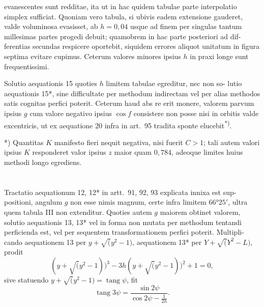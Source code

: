 \documentclass[12pt,a4paper]{article}
\newcommand{\tang}{\mathop{\mathrm{tang}}\nolimits}
\begin{document}
evanescentes sunt redditae, ita ut in hac quidem tabulae parte interpolatio
simplex sufficiat. Quoniam vero tabula, si ubivis eadem extensione gauderet,
valde voluminosa evasisset, ab $h = 0{,}04$ usque ad finem per singulas tantum
millesimas partes progedi debuit; quamobrem in hac parte posteriori ad dif-
ferentias secundas respicere oportebit, siquidem errores aliquot unitatum in
figura septima evitare cupimus. Ceterum valores minores ipsius $h$ in praxi
longe sunt frequentissimi.

Solutio aequationis 15 quoties $h$ limitem tabulae egreditur, nec non so-
lutio aequationis 15*, sine difficultate per methodum indirectam vel per alias
methodos satis cognitas perfici poterit. Ceterum haud abs re erit monere,
valorem parvum ipsius $g$ cum valore negativo ipsius $\cos f$ consistere non posse
nisi in orbitis valde excentricis, ut ex aequatione 20 infra in art.~95 tradita
sponte elucebit\textsuperscript{*)}.

\begin{flushright}
\small\begin{minipage}{0.8\textwidth}
\raggedleft
*) Quantitas $K$ manifesto fieri nequit negativa, nisi fuerit $C > 1$; tali autem valori ipsius $K$ responderet
valor ipsius $z$ maior quam $0{,}784$, adeoque limites huius methodi longo egrediens.
\end{minipage}
\end{flushright}

\section{}

Tractatio aequationum 12, 12* in artt.~91, 92, 93 explicata innixa est sup-
positioni, angulum $g$ non esse nimis magnum, certe infra limitem $66°25'$, ultra
quem tabula III non extenditur. Quoties autem $g$ maiorem obtinet valorem,
solutio aequationis 13, 13* vel in forma non mutata per methodum tentandi
perficienda est, vel per sequentem transformationem perfici poterit. Multipli-
cando aequationem 13 per $y + \surd(y^2 - 1)$, aequationem 13* per $Y + \surd(Y^2 - L)$,
prodit
\begin{equation}
(y + \surd(y^2 - 1))^3 - 3h(y + \surd(y^2 - 1))^2 + 1 = 0,
\end{equation}
sive statuendo $y + \surd(y^2 - 1) = \tang\psi$, fit
\begin{equation}
\tang 3\psi = \frac{\sin 2\psi}{\cos 2\psi - \frac{1}{2h}}.
\end{equation}
\end{document}
